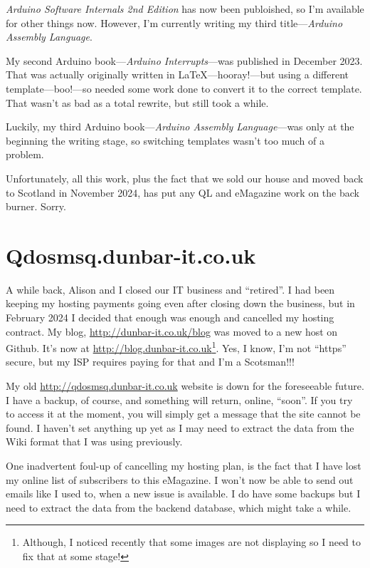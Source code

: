 \emph{Arduino Software Internals 2nd Edition} has now been publoished, so I'm available for other things now. However, I'm currently writing my third title---\emph{Arduino Assembly Language}.

My second Arduino book---\emph{Arduino Interrupts}---was published in December 2023. That was actually originally written in \LaTeX{}---hooray!---but using a different template---boo!---so needed some work done to convert it to the correct template. That wasn't as bad as a total rewrite, but still took a while.

Luckily, my third Arduino book---\emph{Arduino Assembly Language}---was only at the beginning the writing stage, so switching templates wasn't too much of a problem.

Unfortunately, all this work, plus the fact that we sold our house and moved back to Scotland in November 2024, has put any QL and eMagazine work on the back burner. Sorry.


\section{Qdosmsq.dunbar-it.co.uk}

A while back, Alison and I closed our IT business and ``retired''. I had been keeping my hosting payments going even after closing down the business, but in February 2024 I decided that enough was enough and cancelled my hosting contract. My blog, \url{http://dunbar-it.co.uk/blog} was moved to a new host on Github. It's now at \url{http://blog.dunbar-it.co.uk}\footnote{Although, I noticed recently that some images are not displaying so I need to fix that at some stage!}. Yes, I know, I'm not ``https'' secure, but my ISP requires paying for that and I'm a Scotsman!!!

My old \url{http://qdosmsq.dunbar-it.co.uk} website is down for the foreseeable future. I have a backup, of course, and something will return, online, ``soon''. If you try to access it at the moment, you will simply get a message that the site cannot be found. I haven't set anything up yet as I may need to extract the data from the Wiki format that I was using previously.

One inadvertent foul-up of cancelling my hosting plan, is the fact that I have lost my online list of subscribers to this eMagazine. I won't now be able to send out emails like I used to, when a new issue is available. I do have some backups but I need to extract the data from the backend database, which might take a while.

